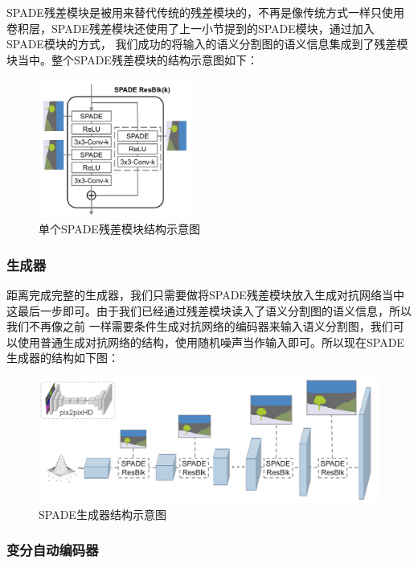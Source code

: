 \documentclass[supercite]{HustGraduPaper}
\theoremstyle{definition}
\begin{document}
SPADE残差模块是被用来替代传统的残差模块的，不再是像传统方式一样只使用卷积层，SPADE残差模块还使用了上一小节提到的SPADE模块，通过加入SPADE模块的方式，
我们成功的将输入的语义分割图的语义信息集成到了残差模块当中。整个SPADE残差模块的结构示意图如下：
\begin{figure}[H]
  \begin{center}
  \includegraphics[width=5cm]{images/SPADE-ResBlock}
  \end{center}
  \caption{单个SPADE残差模块结构示意图}
  \label{fig:SPADE-ResBlock}
\end{figure}

\subsubsection{生成器}

距离完成完整的生成器，我们只需要做将SPADE残差模块放入生成对抗网络当中这最后一步即可。由于我们已经通过残差模块读入了语义分割图的语义信息，所以我们不再像之前
一样需要条件生成对抗网络的编码器来输入语义分割图，我们可以使用普通生成对抗网络的结构，使用随机噪声当作输入即可。所以现在SPADE生成器的结构如下图：
\begin{figure}[H]
  \begin{center}
  \includegraphics[width=12cm]{images/SPADE-generator}
  \end{center}
  \caption{SPADE生成器结构示意图}
  \label{fig:SPADE-generator}
\end{figure}

\subsubsection{变分自动编码器}
\end{document}
